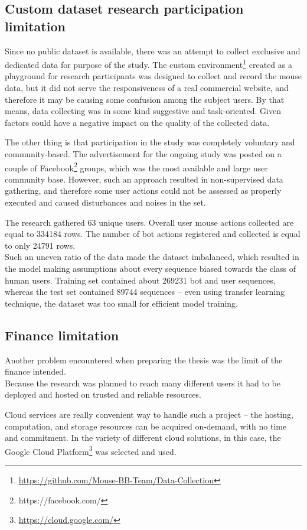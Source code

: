 \subsection{Custom dataset research participation limitation}
Since no public dataset is available, there was an attempt to collect exclusive and dedicated data for purpose of the study.
The custom environment\footnote{\url{https://github.com/Mouse-BB-Team/Data-Collection}} created as a playground for research participants was designed to collect and record the mouse data, but it did not serve the responsiveness of a real commercial website, and therefore it may be causing some confusion among the subject users. By that means, data collecting was in some kind suggestive and task-oriented. Given factors could have a negative impact on the quality of the collected data.

The other thing is that participation in the study was completely voluntary and community-based.
The advertisement for the ongoing study was posted on a couple of Facebook\footnote{https://facebook.com/} groups, which was the most available and large user community base. However, such an approach resulted in non-supervised data gathering, and therefore some user actions could not be assessed as properly executed and caused disturbances and noises in the set.

The research gathered \num{63} unique users. Overall user mouse actions collected are equal to \num{334184} rows.
The number of bot actions registered and collected is equal to only \num{24791} rows.\\
Such an uneven ratio of the data made the dataset imbalanced, which resulted in the model making assumptions about every sequence biased towards the class of human users.
Training set contained about \num{269231} bot and user sequences, whereas the test set contained \num{89744} sequences – even using transfer learning technique, the dataset was too small for efficient model training.

\subsection{Finance limitation}
Another problem encountered when preparing the thesis was the limit of the finance intended.\\
Because the research was planned to reach many different users it had to be deployed and hosted on trusted and reliable resources.

Cloud services are really convenient way to handle such a project – the hosting, computation, and storage resources can be acquired on-demand, with no time and commitment.
In the variety of different cloud solutions, in this case, the Google Cloud Platform\footnote{\url{https://cloud.google.com/}} was selected and used.

